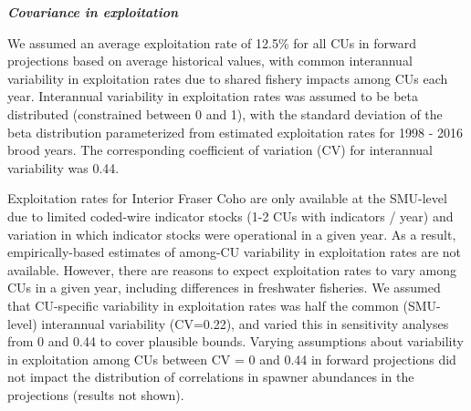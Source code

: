 \documentclass[11pt]{book}
\begin{document}
\textbf{\emph{Covariance in exploitation}}

We assumed an average exploitation rate of 12.5\% for all CUs in forward projections based on average historical values, with common interannual variability in exploitation rates due to shared fishery impacts among CUs each year. Interannual variability in exploitation rates was assumed to be beta distributed (constrained between 0 and 1), with the standard deviation of the beta distribution parameterized from estimated exploitation rates for 1998 - 2016 brood years. The corresponding coefficient of variation (CV) for interannual variability was 0.44.

Exploitation rates for Interior Fraser Coho are only available at the SMU-level due to limited coded-wire indicator stocks (1-2 CUs with indicators / year) and variation in which indicator stocks were operational in a given year. As a result, empirically-based estimates of among-CU variability in exploitation rates are not available. However, there are reasons to expect exploitation rates to vary among CUs in a given year, including differences in freshwater fisheries. We assumed that CU-specific variability in exploitation rates was half the common (SMU-level) interannual variability (CV=0.22), and varied this in sensitivity analyses from 0 and 0.44 to cover plausible bounds. Varying assumptions about variability in exploitation among CUs between CV = 0 and 0.44 in forward projections did not impact the distribution of correlations in spawner abundances in the projections (results not shown).
\end{document}
